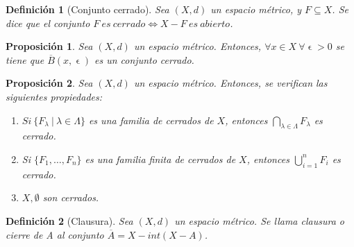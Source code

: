 \documentclass[11pt, a4paper, titlepage]{article}
\let\epsilon\upvarepsilon
\theoremstyle{theorem-style}
\newtheorem*{nprop}{Proposición}
\theoremstyle{definition-style}
\newtheorem*{ndef}{Definición}
\theoremstyle{remark-style}
\theoremstyle{example-style}
\newenvironment{nlist}
{\begin{enumerate}
\renewcommand\labelenumi{(\emph{\roman{enumi})}}}
{\end{enumerate}}
\begin{document}
\begin{ndef}[Conjunto cerrado]
Sea $(X,d)$ un espacio métrico, y $F\subseteq X$. Se dice que el conjunto $F\ es\ cerrado \iff X-F\ es\ abierto$.
\end{ndef}



\begin{nprop}
Sea $(X,d)$ un espacio métrico. Entonces, $\forall x\in X \ \forall \epsilon > 0$ se tiene que $\overline{B}(x,\epsilon)$ es un conjunto cerrado.
\end{nprop}



\begin{nprop}
Sea $(X,d)$ un espacio métrico. Entonces, se verifican las siguientes propiedades:

\begin{nlist}
\item $Si\ \{F_\lambda \ | \ \lambda \in \Lambda \}$ es una familia de cerrados de $X$, entonces $\displaystyle \bigcap_{\lambda \in \Lambda} F_\lambda$ es cerrado.

\item Si $\{F_1,\dots, F_n\}$ es una familia finita de cerrados de $X$, entonces $\displaystyle \bigcup_{i=1}^n F_i$ es cerrado.

\item $X,\emptyset$ son cerrados.
\end{nlist}

\end{nprop}



\begin{ndef}[Clausura]
Sea $(X,d)$ un espacio métrico. Se llama \textit{clausura o cierre de A} al conjunto $\overline{A} = X - int(X-A)$.
\end{ndef}
\end{document}
